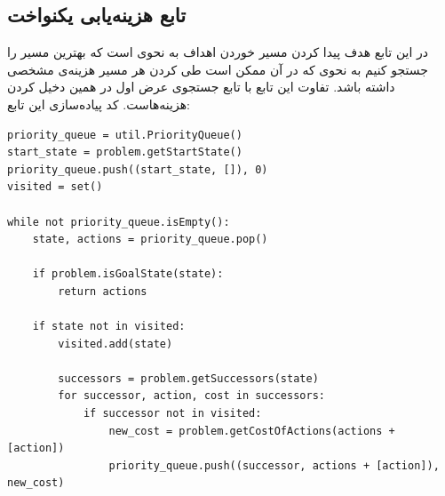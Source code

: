 \documentclass[11pt, a4paper, oneside]{book}
\begin{document}
	\subsection{تابع هزینه‌یابی یکنواخت}
	در این تابع هدف پیدا کردن مسیر خوردن اهداف به نحوی است که بهترین مسیر را جستجو کنیم به نحوی که در آن ممکن است طی کردن هر مسیر هزینه‌ی مشخصی داشته باشد. تفاوت این تابع با تابع جستجوی عرض اول در همین دخیل کردن هزینه‌هاست. کد پیاده‌سازی این تابع:
\begin{LTR}
\begin{verbatim}
priority_queue = util.PriorityQueue()
start_state = problem.getStartState()
priority_queue.push((start_state, []), 0)
visited = set()

while not priority_queue.isEmpty():
    state, actions = priority_queue.pop()

    if problem.isGoalState(state):
        return actions

    if state not in visited:
        visited.add(state)

        successors = problem.getSuccessors(state)
        for successor, action, cost in successors:
            if successor not in visited:
                new_cost = problem.getCostOfActions(actions + [action])
                priority_queue.push((successor, actions + [action]), new_cost)
\end{verbatim}
\end{LTR}
	
	
	
\end{document}
